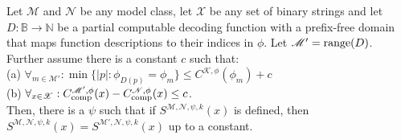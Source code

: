 \documentclass{style/llncs}
\newcommand{\M}{\mathscr M}
\newcommand{\K}{\mathscr K}
\newcommand{\X}{\mathscr X}
\newcommand{\B}{\mathbb B}
\newcommand{\N}{\mathbb N}
\newcommand{\Nm}{\mathscr N}
\newcommand{\tn}[1]{\textnormal{#1}}
\newcommand{\Cc}{C_\tn{comp}}
\begin{document}
\begin{lemma}
\label{lemma:thecoolone}
Let $\M$ and $\Nm$ be any model class, let $\X$ be any set of binary strings and let $D:\B\to\N$ be a partial computable decoding function with a prefix-free domain that maps function descriptions to their indices in $\phi$. Let $\M'= \tn{range}(D)$. Further assume there is a constant $c$ such that:\\
\-\hspace{1cm}(a) $\forall_{m\in\M'}:\min\{|p|:\phi_{D(p)}=\phi_m\}\le C^{\K,\phi}(\phi_m)+c$\\
\-\hspace{1cm}(b) $\forall_{x\in\X}: \Cc^{\M', \phi}(x) - \Cc^{\Nm, \phi}(x) \le c$.\\
Then, there is a $\psi$ such that if $S^{\M,\Nm,\psi,k}(x)$ is defined, then $S^{\M,\Nm,\psi,k}(x) = S^{\M',\Nm,\psi,k}(x)$ up to a constant. 
\end{lemma}
\end{document}

